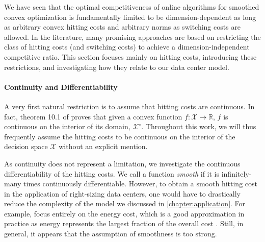 We have seen that the optimal competitiveness of online algorithms for smoothed convex optimization is fundamentally limited to be dimension-dependent as long as arbitrary convex hitting costs and arbitrary norms as switching costs are allowed. In the literature, many promising approaches are based on restricting the class of hitting costs (and switching costs) to achieve a dimension-independent competitive ratio. This section focuses mainly on hitting costs, introducing these restrictions, and investigating how they relate to our data center model.

\paragraph{Continuity and Differentiability} A very first natural restriction is to assume that hitting costs are continuous. In fact, theorem 10.1 of \cite{Rockafellar1970} proves that given a convex function $f : \mathcal{X} \to \mathbb{R}$, $f$ is continuous on the interior of its domain, $\mathcal{X}^{\circ}$. Throughout this work, we will thus frequently assume the hitting costs to be continuous on the interior of the decision space $\mathcal{X}$ without an explicit mention.

As continuity does not represent a limitation, we investigate the continuous differentiability of the hitting costs. We call a function \emph{smooth} if it is infinitely-many times continuously differentiable. However, to obtain a smooth hitting cost in the application of right-sizing data centers, one would have to drastically reduce the complexity of the model we discussed in \autoref{chapter:application}. For example, \citeauthor*{Bansal2015} focus entirely on the energy cost, which is a good approximation in practice as energy represents the largest fraction of the overall cost \cite{Bansal2015}. Still, in general, it appears that the assumption of smoothness is too strong.
